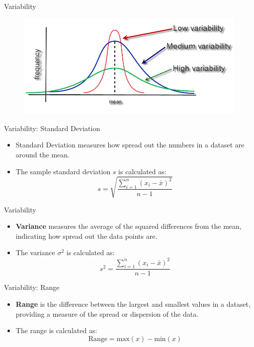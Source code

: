 \documentclass[
  ignorenonframetext,
]{beamer}
\providecommand{\tightlist}{%
  \setlength{\itemsep}{0pt}\setlength{\parskip}{0pt}}
\begin{document}
\begin{frame}{Variability}
\label{variability}
\begin{figure}
\includegraphics[width=0.8\linewidth]{fig/variability} \end{figure}
\end{frame}

\begin{frame}{Variability: Standard Deviation}
\label{variability-standard-deviation}
\begin{itemize}
\tightlist
\item
  Standard Deviation measures how spread out the numbers in a dataset
  are around the mean.
\end{itemize}

\begin{itemize}
\tightlist
\item
  The sample standard deviation \(s\) is calculated as:
  \[s = \sqrt{\frac{\sum_{i=1}^{n} (x_i - \bar{x})^2}{n - 1}}\]
\end{itemize}
\end{frame}

\begin{frame}{Variability}
\label{variability-1}
\begin{itemize}
\tightlist
\item
  \textbf{Variance} measures the average of the squared differences from
  the mean, indicating how spread out the data points are.
\end{itemize}

\begin{itemize}
\tightlist
\item
  The variance \(\sigma^2\) is calculated as:
  \[s^2 = \frac{\sum_{i=1}^{n} (x_i - \bar{x})^2}{n - 1}\]
\end{itemize}
\end{frame}

\begin{frame}{Variability: Range}
\label{variability-range}
\begin{itemize}
\tightlist
\item
  \textbf{Range} is the difference between the largest and smallest
  values in a dataset, providing a measure of the spread or dispersion
  of the data.
\end{itemize}

\begin{itemize}
\tightlist
\item
  The range is calculated as:
  \[\text{Range} = \text{max}(x) - \text{min}(x)\]
\end{itemize}
\end{frame}
\end{document}
